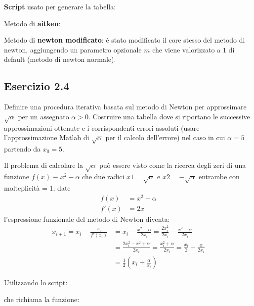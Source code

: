 \textbf{Script} usato per generare la tabella:


Metodo di \textbf{aitken}:


Metodo di \textbf{newton modificato}: è stato modificato il core stesso del metodo di newton, aggiungendo un parametro opzionale $m$ che viene valorizzato a $1$ di default (metodo di newton normale).

	\subsection{Esercizio 2.4}

Definire una procedura iterativa basata sul metodo di Newton per approssimare $\sqrt{\alpha}$ per un assegnato $\alpha > 0$. Costruire una tabella dove
si riportano le successive approssimazioni ottenute e i corrispondenti errori assoluti (usare l’approssimazione Matlab di $\sqrt{\alpha}$ per il calcolo dell'errore) nel caso in cui $\alpha = 5$ partendo da $x_0 = 5$.

Il problema di calcolare la $\sqrt{\alpha}$ può essere visto come la ricerca degli zeri di una funzione $f(x) \equiv x^2 - \alpha$ che due radici $x1=\sqrt{\alpha}$ e $x2= -\sqrt{\alpha}$ entrambe con molteplicità = 1; date
\begin{equation*}
	\begin{split}
		f(x) & = x^2 - \alpha \\
		f'(x) & = 2x
	\end{split}
\end{equation*}
l'espressione funzionale del metodo di Newton diventa:
\begin{equation*}
	\begin{split}
		x_{i+1} = x_i - \frac{x_i}{f'(x_i)} & = x_i - \frac{x^2-\alpha}{2x_i} = \frac{2x_i^2}{2x_i} - \frac{x^2-\alpha}{2x_i} \\
		& = \frac{2x_i^2 - x^2 + \alpha}{2x_i} = \frac{x_i^2+\alpha}{2x_i} = \frac{x_i}{2} + \frac{\alpha}{2x_i} \\
		& = \frac{1}{2}(x_i + \frac{\alpha}{x_i})
	\end{split}	
\end{equation*}

Utilizzando lo script:


che richiama la funzione:


